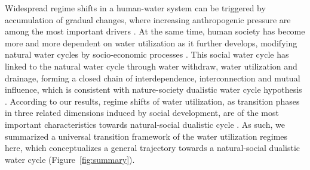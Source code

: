 \documentclass[9pt, twocolumn, twoside, lineno]{pnas-new}
\begin{document}
Widespread regime shifts in a human-water system can be triggered by accumulation of gradual changes, where increasing anthropogenic pressure are among the most important drivers \cite{rochaCascadingRegimeShifts2018,falkenmarkUnderstandingWaterResilience2019}. 
At the same time, human society has become more and more dependent on water utilization as it further develops, modifying natural water cycles by socio-economic processes \cite{gleesonIlluminatingWaterCycle2020,dibaldassarreSociohydrologyScientificChallenges2019}.
This social water cycle has linked to the natural water cycle through water withdraw, water utilization and drainage, forming a closed chain of interdependence, interconnection and mutual influence, which is consistent with nature-society dualistic water cycle hypothesis
\cite{qinTheoreticalFrameworkDualistic2014,liuDualisticWaterCycle2010}.
According to our results, regime shifts of water utilization, as transition phases in three related dimensions induced by social development, are of the most important characteristics towards natural-social dualistic cycle
\cite{cummingImplicationsAgriculturalTransitions2014,cummingLinkingEconomicGrowth2018}.
As such, we summarized a universal transition framework of the water utilization regimes here, which conceptualizes a general trajectory towards a natural-social dualistic water cycle (Figure~\ref{fig:summary}).
\end{document}
